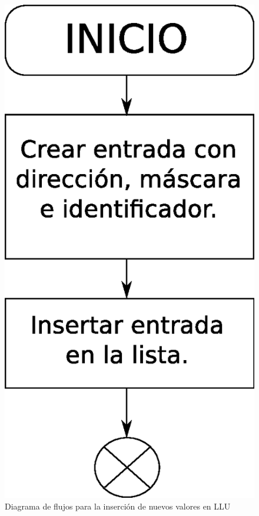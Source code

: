 \begin{figure}[H]
  \centering
	\includegraphics[scale=0.50]{4-implementacion/graf/lluinsert.eps}
  \caption{Diagrama de flujos para la inserción de nuevos valores en LLU}
  \label{fig:lluinsert}
\end{figure}

